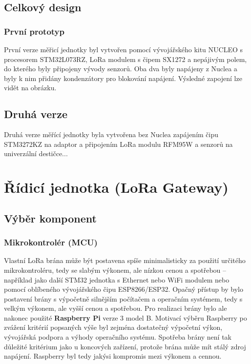 \subsection{Celkový design} 

\subsubsection{První prototyp}
    První verze měřicí jednotky byl vytvořen pomocí vývojářského kitu NUCLEO s procesorem STM32L073RZ, LoRa modulem s čipem SX1272 a nepájivým polem, do kterého byly připojeny vývody senzorů. Oba dva byly napájeny z Nuclea a byly k nim přidány kondenzátory pro blokování napájení. Výsledné zapojení lze vidět na obrázku.
    
    
\subsection{Druhá verze}
    Druhá verze měřící jednotky byla vytvořena bez Nuclea zapájením čipu STM3272KZ na adaptor a připojením LoRa modulu RFM95W a senzorů na univerzální destičce...
    














\section{Řídicí jednotka (LoRa Gateway)}
\subsection{Výběr komponent}
\subsubsection{Mikrokontrolér (MCU)}

    Vlastní LoRa brána může být postavena spíše minimalisticky za použití určitého mikrokontroléru, tedy se slabým výkonem, ale nízkou cenou a spotřebou – například jako další STM32 jednotka s Ethernet nebo WiFi modulem nebo pomocí oblíbeného vývojářského čipu ESP8266/ESP32. Opačný přístup by bylo postavení brány s výpočetně silnějším počítačem a operačním systémem, tedy s velkým výkonem, ale vyšší cenou a spotřebou.
    Pro realizaci brány bylo ale nakonec použité \textbf{Raspberry Pi} verze 3 model B. 
    Motivací výběru Raspberry po zvážení kritérií popsaných výše byl zejména dostatečný výpočetní výkon, vývojářská podpora a výhody operačního systému. Spotřeba brány není tak důležité kritérium jako u koncových zařízení, protože brána může mít stálý zdroj napájení. Raspberry byl tedy jakýsi kompromis mezi výkonem a cennou.

